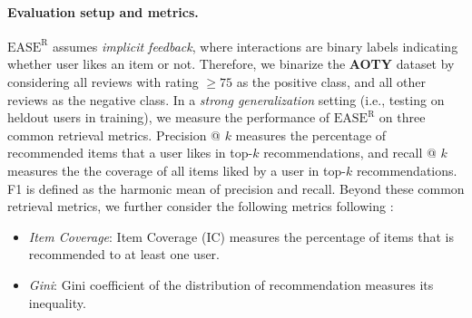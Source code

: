 \documentclass{article}
\newcommand{\aoty}{{\bf AOTY}\xspace}
\newcommand{\easer}{$\text{EASE}^\text{R}$\xspace}
\begin{document}
\paragraph*{Evaluation setup and metrics.}
\easer assumes {\em implicit feedback}, where interactions are binary
labels indicating whether user likes an item or not.
Therefore, we binarize the \aoty dataset by considering all reviews with rating
 $\ge 75$ as the positive class, and all other reviews as the negative class.
In a {\em strong generalization} setting (i.e., testing on heldout users in
 training), we measure the performance of \easer on three common retrieval
 metrics.
Precision @ $k$ measures the percentage of recommended items that a user likes
 in top-$k$ recommendations, and recall @ $k$ measures the the coverage of all
 items liked by a user in top-$k$ recommendations.
F1 is defined as the harmonic mean of precision and recall.
Beyond these common retrieval metrics, we further consider the following
 metrics following \citet{anelliTopNRecommendationAlgorithms2022}:
 \begin{itemize} \item {\em Item Coverage}: Item Coverage (IC) measures the
 percentage of items that is recommended to at least one user.
\item {\em Gini}: Gini coefficient of the distribution of recommendation
measures its inequality.
\end{itemize}
\end{document}
